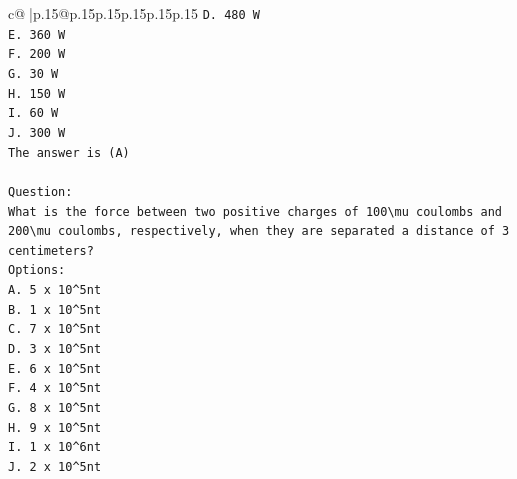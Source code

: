 \documentclass{article}
\begin{document}
{\begin{supertabular}{c@{$\;$}|p{.15\linewidth}@{}p{.15\linewidth}p{.15\linewidth}p{.15\linewidth}p{.15\linewidth}p{.15\linewidth}}
{{{\texttt{D. 480 W} \\
\texttt{E. 360 W} \\
\texttt{F. 200 W} \\
\texttt{G. 30 W} \\
\texttt{H. 150 W} \\
\texttt{I. 60 W} \\
\texttt{J. 300 W} \\
\texttt{The answer is (A)} \\
\\ 
\texttt{Question:} \\
\texttt{What is the force between two positive charges of 100\textbackslash{}mu coulombs and 200\textbackslash{}mu coulombs, respectively, when they are separated a distance of 3 centimeters?} \\
\texttt{Options:} \\
\texttt{A. 5 x 10\^{}5nt} \\
\texttt{B. 1 x 10\^{}5nt} \\
\texttt{C. 7 x 10\^{}5nt} \\
\texttt{D. 3 x 10\^{}5nt} \\
\texttt{E. 6 x 10\^{}5nt} \\
\texttt{F. 4 x 10\^{}5nt} \\
\texttt{G. 8 x 10\^{}5nt} \\
\texttt{H. 9 x 10\^{}5nt} \\
\texttt{I. 1 x 10\^{}6nt} \\
\texttt{J. 2 x 10\^{}5nt} \\
            }
        }
    }
     \\ \\


\end{supertabular}}
\end{document}
